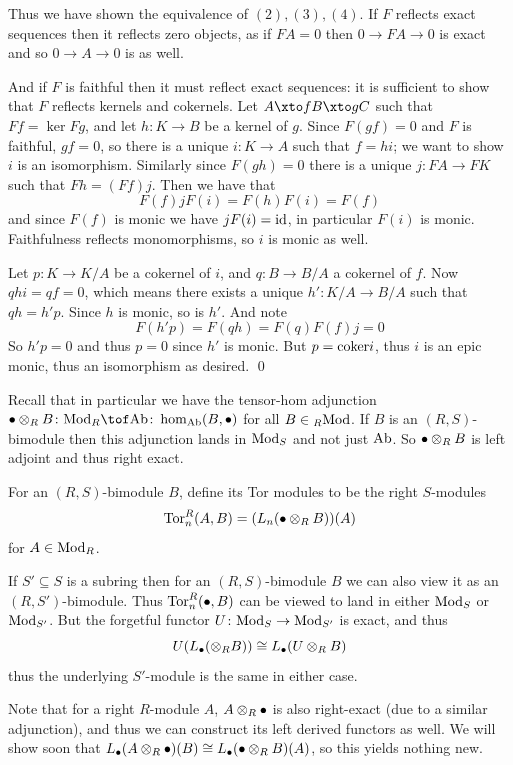     Thus we have shown the equivalence of $(2),(3),(4)$.
    If $F$ reflects exact sequences then it reflects zero objects, as if $FA=0$ then $0\to FA\to0$ is exact and so $0\to A\to0$ is as well.

    And if $F$ is faithful then it must reflect exact sequences: it is sufficient to show that $F$ reflects kernels and cokernels.
    Let $A\xto fB\xto gC$ such that $Ff=\ker Fg$, and let $h\colon K\to B$ be a kernel of $g$.
    Since $F(gf)=0$ and $F$ is faithful, $gf=0$, so there is a unique $i\colon K\to A$ such that $f=hi$; we want to show $i$ is an isomorphism.
    Similarly since $F(gh)=0$ there is a unique $j\colon FA\to FK$ such that $Fh=(Ff)j$.
    Then we have that
    $$ F(f)jF(i) = F(h)F(i) = F(f) $$
    and since $F(f)$ is monic we have $jF(i)={\rm id}$, in particular $F(i)$ is monic.
    Faithfulness reflects monomorphisms, so $i$ is monic as well.

    Let $p\colon K\to K/A$ be a cokernel of $i$, and $q\colon B\to B/A$ a cokernel of $f$.
    Now $qhi=qf=0$, which means there exists a unique $h'\colon K/A\to B/A$ such that $qh=h'p$.
    Since $h$ is monic, so is $h'$.
    And note
    $$ F(h'p) = F(qh) = F(q)F(f)j = 0 $$
    So $h'p=0$ and thus $p=0$ since $h'$ is monic.
    But $p={\rm coker} i$, thus $i$ is an epic monic, thus an isomorphism as desired.
    \qed

\eproof

Recall that in particular we have the tensor-hom adjunction $\bul\otimes_RB\colon\Mod_R\tof\Ab\colon\hom_\Ab(B,\bul)$ for all $B\in{}_R{\rm Mod}$.
If $B$ is an $(R,S)$-bimodule then this adjunction lands in ${\rm Mod}_S$ and not just ${\rm Ab}$.
So $\bullet\otimes_RB$ is left adjoint and thus right exact.

\bdefn

    For an $(R,S)$-bimodule $B$, define its {\emphcolor Tor modules} to be the right $S$-modules
    $$ {\rm Tor}^R_n(A,B) = (L_n(\bullet\otimes_RB))(A) $$
    for $A\in{\rm Mod}_R$.

\edefn

If $S'\subseteq S$ is a subring then for an $(R,S)$-bimodule $B$ we can also view it as an $(R,S')$-bimodule.
Thus ${\rm Tor}^R_n(\bullet,B)$ can be viewed to land in either ${\rm Mod}_S$ or ${\rm Mod}_{S'}$.
But the forgetful functor $U\colon{\rm Mod}_S\to{\rm Mod}_{S'}$ is exact, and thus
$$ U(L_\bullet(\otimes_RB)) \cong L_\bullet(U\otimes_RB) $$
thus the underlying $S'$-module is the same in either case.

Note that for a right $R$-module $A$, $A\otimes_R\bullet$ is also right-exact (due to a similar adjunction), and thus we can construct its left derived functors
as well.
We will show soon that $L_\bullet(A\otimes_R\bullet)(B)\cong L_\bullet(\bullet\otimes_RB)(A)$, so this yields nothing new.

